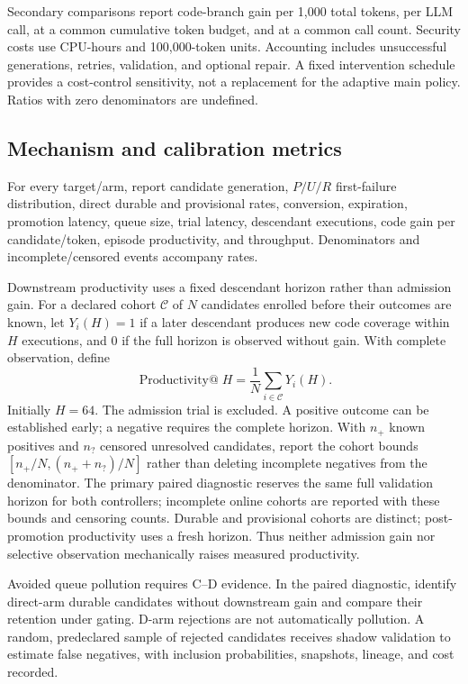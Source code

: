 \documentclass[final,5p,times,number]{elsarticle}
\begin{document}
Secondary comparisons report code-branch gain per 1,000 total tokens, per LLM call, at a common cumulative token budget, and at a common call count. Security costs use CPU-hours and 100,000-token units. Accounting includes unsuccessful generations, retries, validation, and optional repair. A fixed intervention schedule provides a cost-control sensitivity, not a replacement for the adaptive main policy. Ratios with zero denominators are undefined.

\subsection{Mechanism and calibration metrics}
For every target/arm, report candidate generation, $P/U/R$ first-failure distribution, direct durable and provisional rates, conversion, expiration, promotion latency, queue size, trial latency, descendant executions, code gain per candidate/token, episode productivity, and throughput. Denominators and incomplete/censored events accompany rates.

Downstream productivity uses a fixed descendant horizon rather than admission gain. For a declared cohort $\mathcal{C}$ of $N$ candidates enrolled before their outcomes are known, let $Y_i(H)=1$ if a later descendant produces new code coverage within $H$ executions, and $0$ if the full horizon is observed without gain. With complete observation, define
\begin{equation}
\operatorname{Productivity@}H=\frac{1}{N}\sum_{i\in\mathcal{C}}Y_i(H).
\end{equation}
Initially $H=64$. The admission trial is excluded. A positive outcome can be established early; a negative requires the complete horizon. With $n_+$ known positives and $n_?$ censored unresolved candidates, report the cohort bounds $[n_+/N,(n_++n_?)/N]$ rather than deleting incomplete negatives from the denominator. The primary paired diagnostic reserves the same full validation horizon for both controllers; incomplete online cohorts are reported with these bounds and censoring counts. Durable and provisional cohorts are distinct; post-promotion productivity uses a fresh horizon. Thus neither admission gain nor selective observation mechanically raises measured productivity.

Avoided queue pollution requires C--D evidence. In the paired diagnostic, identify direct-arm durable candidates without downstream gain and compare their retention under gating. D-arm rejections are not automatically pollution. A random, predeclared sample of rejected candidates receives shadow validation to estimate false negatives, with inclusion probabilities, snapshots, lineage, and cost recorded.
\end{document}
